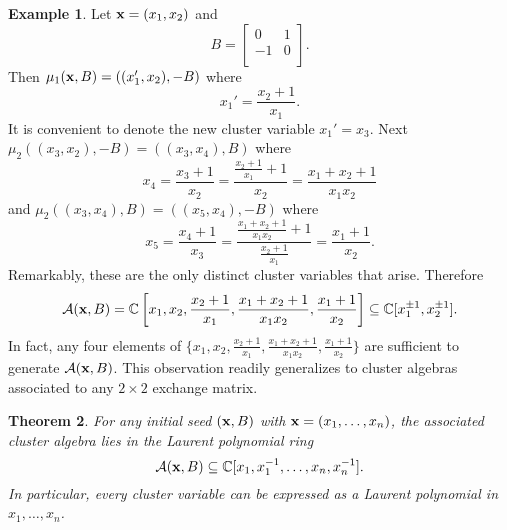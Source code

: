 \documentclass{amsart}
\newtheorem{theorem}{Theorem}[section]
\theoremstyle{definition}
\newtheorem{example}[theorem]{Example}
\theoremstyle{remark}
\numberwithin{equation}{section}
\newcommand{\cA}{{\mathcal{A}}}
\newcommand{\x}{{\bf x}}
\newcommand{\CC}{{\mathbb{C}}}
\begin{document}
  \begin{example}\label{example:type A2}
		Let $\x = (x_1,x_2)$ and
		\begin{displaymath}
			B = \left[ \begin{array}{cc}
			0 & 1 \\
			-1 & 0 \\
			\end{array}
			\right].
		\end{displaymath}
		Then $\mu_1(\x,B) = ((x_1',x_2), -B)$ where
		\begin{displaymath}
			x_1' = \frac{x_2+1}{x_1}.
		\end{displaymath}
		It is convenient to denote the new cluster variable $x_1'=x_3$.  Next $\mu_2((x_3,x_2),-B) = ((x_3,x_4),B)$ where
		\begin{displaymath}
			x_4 = \frac{x_3+1}{x_2} = \frac{\frac{x_2+1}{x_1}+1}{x_2} = \frac{x_1 + x_2 + 1}{x_1x_2}
		\end{displaymath}
		and  $\mu_2((x_3,x_4),B) = ((x_5,x_4),-B)$ where
		\begin{displaymath}
			x_5 = \frac{x_4+1}{x_3} = \frac{\frac{x_1 + x_2 + 1}{x_1x_2}+1}{\frac{x_2+1}{x_1}} = \frac{x_1+1}{x_2}.
		\end{displaymath}
		Remarkably, these are the only distinct cluster variables that arise.  Therefore
		\begin{displaymath}
			\cA(\x,B) = \CC\left[x_1,x_2,\frac{x_2+1}{x_1},\frac{x_1 + x_2 + 1}{x_1x_2},\frac{x_1+1}{x_2}\right] \subseteq \CC[x_1^{\pm1},x_2^{\pm1}].
		\end{displaymath}
    In fact, any four elements of $\{x_1,x_2,\frac{x_2+1}{x_1},\frac{x_1 + x_2 + 1}{x_1x_2},\frac{x_1+1}{x_2}\}$ are sufficient to generate $\cA(\x,B)$.  This observation readily generalizes to cluster algebras associated to any $2\times 2$ exchange matrix. %
  \end{example}
	
	\begin{theorem}\label{th:Laurent phenomenon}
		For any initial seed $(\x,B)$ with $\x = (x_1,\ldots, x_n)$, the associated cluster algebra lies in the Laurent polynomial ring
		\begin{displaymath}
			\cA(\x,B) \subseteq \CC[x_1, x_1^{-1}, \ldots, x_n, x_n^{-1}].
		\end{displaymath}
		In particular, every cluster variable can be expressed as a Laurent polynomial in $x_1,\ldots, x_n$.
	\end{theorem}
	
\end{document}
